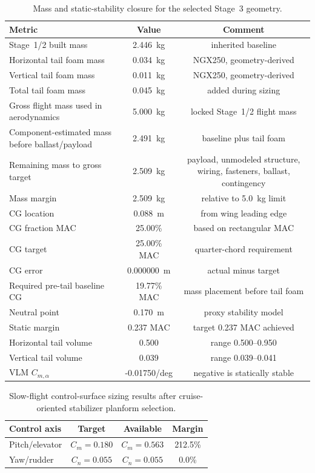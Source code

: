 \documentclass[11pt]{article}
\begin{document}
\begin{table}[H]
\centering
\begin{tabular}{lcc}
\toprule
Metric & Value & Comment \\
\midrule
Stage~1/2 built mass & \SI{2.446}{kg} & inherited baseline \\
Horizontal tail foam mass & \SI{0.034}{kg} & NGX250, geometry-derived \\
Vertical tail foam mass & \SI{0.011}{kg} & NGX250, geometry-derived \\
Total tail foam mass & \SI{0.045}{kg} & added during sizing \\
Gross flight mass used in aerodynamics & \SI{5.000}{kg} & locked Stage~1/2 flight mass \\
Component-estimated mass before ballast/payload & \SI{2.491}{kg} & baseline plus tail foam \\
Remaining mass to gross target & \SI{2.509}{kg} & payload, unmodeled structure, wiring, fasteners, ballast, contingency \\
Mass margin & \SI{2.509}{kg} & relative to \SI{5.0}{kg} limit \\
CG location & \SI{0.088}{m} & from wing leading edge \\
CG fraction MAC & 25.00\% & based on rectangular MAC \\
CG target & 25.00\% MAC & quarter-chord requirement \\
CG error & \SI{0.000000}{m} & actual minus target \\
Required pre-tail baseline CG & 19.77\% MAC & mass placement before tail foam \\
Neutral point & \SI{0.170}{m} & proxy stability model \\
Static margin & 0.237 MAC & target 0.237 MAC achieved \\
Horizontal tail volume & 0.500 & range 0.500--0.950 \\
Vertical tail volume & 0.039 & range 0.039--0.041 \\
VLM \(C_{m,\alpha}\) & -0.01750/deg & negative is statically stable \\
\bottomrule
\end{tabular}
\caption{Mass and static-stability closure for the selected Stage~3 geometry.}
\label{tab:stage3-mass-stability}
\end{table}

\begin{table}[H]
\centering
\begin{tabular}{lccc}
\toprule
Control axis & Target & Available & Margin \\
\midrule
Pitch/elevator & \(C_m=0.180\) & \(C_m=0.563\) & 212.5\% \\
Yaw/rudder & \(C_n=0.055\) & \(C_n=0.055\) & 0.0\% \\
\bottomrule
\end{tabular}
\caption{Slow-flight control-surface sizing results after cruise-oriented stabilizer planform selection.}
\label{tab:stage3-control-authority}
\end{table}
\end{document}
